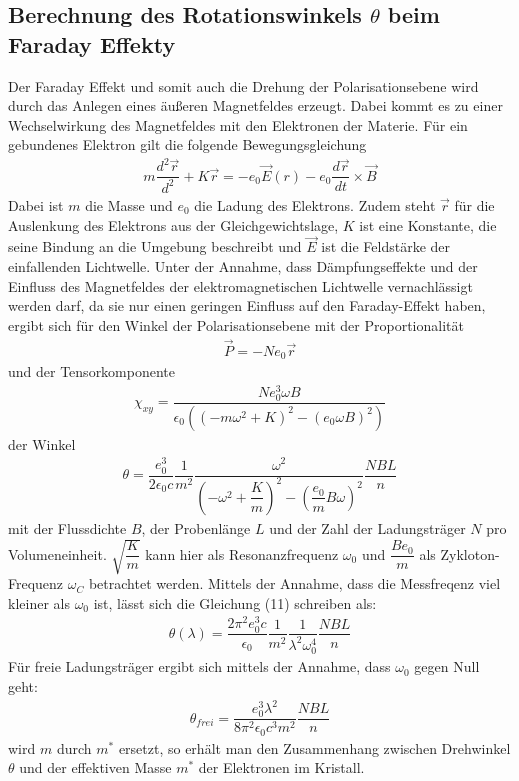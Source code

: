 \documentclass{article}
\begin{document}
\subsection{Berechnung des Rotationswinkels $\theta$ beim Faraday Effekty}
Der Faraday Effekt und somit auch die Drehung der Polarisationsebene wird durch das Anlegen eines äußeren Magnetfeldes erzeugt. Dabei kommt es zu einer Wechselwirkung des Magnetfeldes mit den Elektronen der Materie. Für ein gebundenes Elektron gilt die folgende Bewegungsgleichung 
\begin{align}
m\dfrac{d^2\vec{r}}{d^2}+K\vec{r}=-e_0\vec{E}(r)-e_0\dfrac{d\vec{r}}{dt}\times\vec{B}
\end{align}
Dabei ist $m$ die Masse und $e_0$ die Ladung des Elektrons. Zudem steht $\vec{r}$ für die Auslenkung des Elektrons aus der Gleichgewichtslage, $K$ ist eine Konstante, die seine Bindung an die Umgebung beschreibt und $\vec{E}$ ist die Feldstärke der einfallenden Lichtwelle. Unter der Annahme, dass Dämpfungseffekte und der Einfluss des Magnetfeldes der elektromagnetischen Lichtwelle vernachlässigt werden darf, da sie nur einen geringen Einfluss auf den Faraday-Effekt haben, ergibt sich für den Winkel der Polarisationsebene mit der Proportionalität 
\begin{align}
\vec{P}=-Ne_0\vec{r}
\end{align}
und der Tensorkomponente 
\begin{align}
\chi_{xy}=\dfrac{Ne_0^3\omega B}{\epsilon_0\left(\left(-m\omega^2+K\right)^2-\left(e_0\omega B\right)^2\right)}
\end{align}
der Winkel
\begin{align}
\theta=\dfrac{e_0^3}{2\epsilon_0 c}\dfrac{1}{m^2}\dfrac{\omega^2}{\left(-\omega^2+\dfrac{K}{m}\right)^2 -\left(\dfrac{e_0}{m}B\omega\right)^2}  \dfrac{NBL}{n}
\end{align}
mit der Flussdichte $B$, der Probenlänge $L$ und der Zahl der Ladungsträger $N$ pro Volumeneinheit. $\sqrt{\dfrac{K}{m}}$ kann hier als Resonanzfrequenz $\omega_0$ und $\dfrac{Be_0}{m}$ als Zykloton-Frequenz $\omega_C$ betrachtet werden. Mittels der Annahme, dass die Messfreqenz viel kleiner als $\omega_0$ ist, lässt sich die Gleichung (11) schreiben als:
\begin{align}
\theta(\lambda)=\dfrac{2\pi^2 e_0^3 c}{\epsilon_0}\dfrac{1}{m^2}\dfrac{1}{\lambda^2 \omega_0^4}\dfrac{NBL}{n}
\end{align}
Für freie Ladungsträger ergibt sich mittels der Annahme, dass $\omega_0$ gegen Null geht:
\begin{align}
\theta_{frei}=\dfrac{e_0^3\lambda^2}{8 \pi^2 \epsilon_0 c^3 m^2 }\dfrac{NBL}{n}
\end{align}
wird $m$ durch $m^{\ast}$ ersetzt, so erhält man den Zusammenhang zwischen Drehwinkel $\theta$ und der effektiven Masse $m^{\ast}$ der Elektronen im Kristall. 
\end{document}
